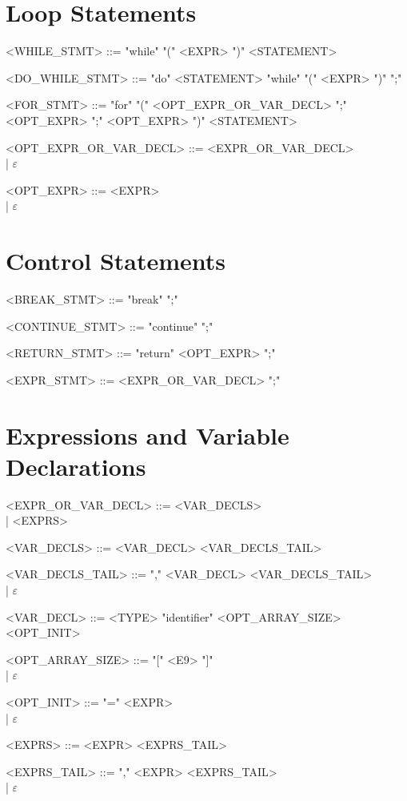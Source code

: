 \section{Loop Statements}
\begin{grammar}
<WHILE\_STMT> ::= "while" "(" <EXPR> ")" <STATEMENT>

<DO\_WHILE\_STMT> ::= "do" <STATEMENT> "while" "(" <EXPR> ")" ";"

<FOR\_STMT> ::= "for" "(" <OPT\_EXPR\_OR\_VAR\_DECL> ";" <OPT\_EXPR> ";" <OPT\_EXPR> ")" <STATEMENT>

<OPT\_EXPR\_OR\_VAR\_DECL> ::= <EXPR\_OR\_VAR\_DECL> \\
                             | $\varepsilon$

<OPT\_EXPR> ::= <EXPR> \\
              | $\varepsilon$
\end{grammar}

\section{Control Statements}
\begin{grammar}
<BREAK\_STMT> ::= "break" ";"

<CONTINUE\_STMT> ::= "continue" ";"

<RETURN\_STMT> ::= "return" <OPT\_EXPR> ";"

<EXPR\_STMT> ::= <EXPR\_OR\_VAR\_DECL> ";"
\end{grammar}

\section{Expressions and Variable Declarations}
\begin{grammar}
<EXPR\_OR\_VAR\_DECL> ::= <VAR\_DECLS> \\
                        | <EXPRS>

<VAR\_DECLS> ::= <VAR\_DECL> <VAR\_DECLS\_TAIL>

<VAR\_DECLS\_TAIL> ::= "," <VAR\_DECL> <VAR\_DECLS\_TAIL> \\
                     | $\varepsilon$

<VAR\_DECL> ::= <TYPE> "identifier" <OPT\_ARRAY\_SIZE> <OPT\_INIT>

<OPT\_ARRAY\_SIZE> ::= "[" <E9> "]" \\
                     | $\varepsilon$

<OPT\_INIT> ::= "=" <EXPR> \\
              | $\varepsilon$

<EXPRS> ::= <EXPR> <EXPRS\_TAIL>

<EXPRS\_TAIL> ::= "," <EXPR> <EXPRS\_TAIL> \\
                | $\varepsilon$
\end{grammar}

